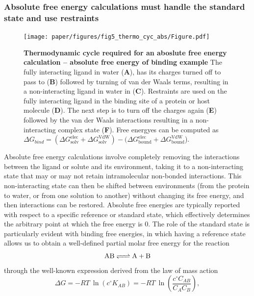 \documentclass[9pt,bestpractices]{livecoms}
\begin{document}
\subsubsection{Absolute free energy calculations must handle the standard state and use restraints}
\label{sec:standardstate-restraints}
%
\begin{figure}[h!]
    \texttt{[image: paper/figures/fig5\_thermo\_cyc\_abs/Figure.pdf]}
    \caption{\textbf{Thermodynamic cycle required for an aboslute free energy calculation -- absolute free energy of binding example} The fully interacting ligand in water (\textbf{A}), has its charges turned off to pass to (\textbf{B}) followed by turning of van der Waals terms, resulting in a non-interacting ligand in water in (\textbf{C}). Restraints are used on the fully interacting ligand in the binding site of a protein or host molecule (\textbf{D}). The next step is to turn off the charges again (\textbf{E}) followed by the van der Waals interactions resulting in a non-interacting complex state (\textbf{F}). Free energyes can be computed as $\Delta G_{bind} = (\Delta G^{\mathrm{elec}}_{\mathrm{solv}}+ \Delta G^{\mathrm{VdW}}_{\mathrm{solv}})-(\Delta G^{\mathrm{elec}}_{\mathrm{bound}}+ \Delta G^{\mathrm{VdW}}_{\mathrm{bound}}$).
    }
    \label{fig:fig_absolute_thermodynamic_cycle}
\end{figure}
%
Absolute free energy calculations involve completely removing the interactions between the ligand or solute and its environment, taking it to a non-interacting state that may or may not retain intramolecular non-bonded interactions.
This non-interacting state can then be shifted between environments (from the protein to water, or from one solution to another) without changing its free energy, and then interactions can be restored.
%
Absolute free energies are typically reported with respect to a specific reference or standard state, which effectively determines the arbitrary point at which the free energy is 0.
The role of the standard state is particularly evident with binding free energies, in which having a reference state allows us to obtain a well-defined partial molar free energy for the reaction
\begin{equation*}
\ce{AB <=> A + B}
\end{equation*}
through the well-known expression derived from the law of mass action
\begin{equation} \label{eq:DGfromKAB}
\Delta G = -RT ~ \ln \left( c^{\circ} K_{AB} \right)  = -RT ~ \ln\left( \frac{c^{\circ} C_{AB}}{C_A C_B} \right) ,
\end{equation}
\end{document}
